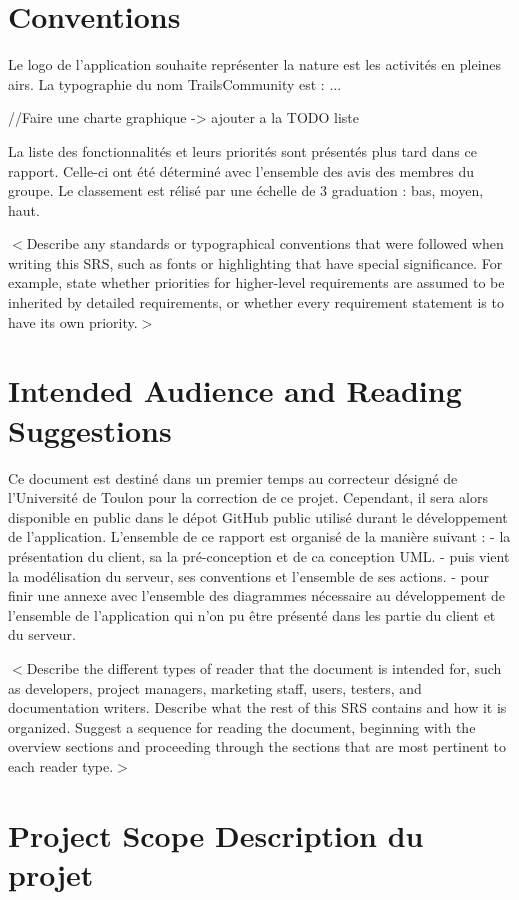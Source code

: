 \documentclass[titlepage]{report}
\begin{document}
\section{Conventions}

Le logo de l'application souhaite représenter la nature est les activités en pleines airs. 
La typographie du nom TrailsCommunity est : ...

//Faire une charte graphique -> ajouter a la TODO liste

La liste des fonctionnalités et leurs priorités sont présentés plus tard dans ce rapport. Celle-ci 
ont été déterminé avec l'ensemble des avis des membres du groupe. Le classement est rélisé par une échelle
de 3 graduation : bas, moyen, haut.

$<$Describe any standards or typographical conventions that were followed when 
writing this SRS, such as fonts or highlighting that have special significance.  
For example, state whether priorities  for higher-level requirements are assumed 
to be inherited by detailed requirements, or whether every requirement statement 
is to have its own priority.$>$

\section{Intended Audience and Reading Suggestions}

Ce document est destiné dans un premier temps au correcteur désigné de l'Université de Toulon pour la correction de ce projet.
Cependant, il sera alors disponible en public dans le dépot GitHub public utilisé durant le développement de l'application.
L'ensemble de ce rapport est organisé de la manière suivant :
- la présentation du client, sa la pré-conception et de ca conception UML.
- puis vient la modélisation du serveur, ses conventions et l'ensemble de ses actions.
- pour finir  une annexe avec l'ensemble des diagrammes nécessaire au développement de l'ensemble de l'application qui n'on pu être présenté
dans les partie du client et du serveur.

$<$Describe the different types of reader that the document is intended for, 
such as developers, project managers, marketing staff, users, testers, and 
documentation writers. Describe what the rest of this SRS contains and how it is 
organized. Suggest a sequence for reading the document, beginning with the 
overview sections and proceeding through the sections that are most pertinent to 
each reader type.$>$

\section{Project Scope Description du projet}
\end{document}
